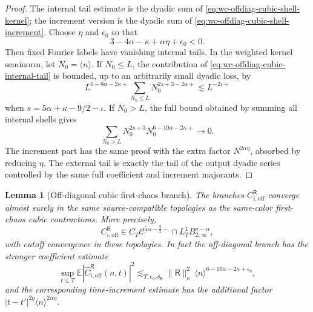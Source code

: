 \documentclass[10pt]{amsart}
\numberwithin{equation}{section}
\theoremstyle{plain}
\newtheorem{lemma}[theorem]{Lemma}
\theoremstyle{definition}
\theoremstyle{remark}
\newcommand{\E}{\mathbb{E}}
\begin{document}
\begin{proof}
The internal tail estimate is the dyadic sum of \eqref{eq:wc-offdiag-cubic-shell-kernel}; the increment version is the dyadic sum of \eqref{eq:wc-offdiag-cubic-shell-increment}.  Choose \(\eta\) and \(\epsilon_0\) so that
\[
        3-4\alpha-\kappa+\alpha\eta+\epsilon_0<0.
\]
Then fixed Fourier labels have vanishing internal tails.  In the weighted kernel seminorm, let \(N_0=\langle n\rangle\).  If \(N_0\le L\), the contribution of \eqref{eq:wc-offdiag-cubic-internal-tail} is bounded, up to an arbitrarily small dyadic loss, by
\[
        L^{6-8\alpha-2\kappa+}
        \sum_{N_0\le L} N_0^{2s+3-2\alpha+}
        \lesssim L^{-2\iota+}
\]
when \(s=5\alpha+\kappa-9/2-\iota\).  If \(N_0>L\), the full bound obtained by summing all internal shells gives
\[
        \sum_{N_0>L}N_0^{2s+3}N_0^{6-10\alpha-2\kappa+}\to0.
\]
The increment part has the same proof with the extra factor \(N^{2\alpha\eta}\), absorbed by reducing \(\eta\).  The external tail is exactly the tail of the output dyadic series controlled by the same full coefficient and increment majorants.
\end{proof}

\begin{lemma}[Off-diagonal cubic first-chaos branch]\label{lem:wc-cubic-offdiag}
The branches \(C_{i,\mathrm{off}}^{\mathsf R}\) converge almost surely in the same source-compatible topologies as the same-color first-chaos cubic contractions.  More precisely,
\begin{equation}\label{eq:wc-cubic-offdiag-bound}
        C_{i,\mathrm{off}}^{\mathsf R}
        \in C_T\mathcal C^{5\alpha-\frac92-}
        \cap L_T^1B_{2,\infty}^{\sigma-\alpha},
\end{equation}
with cutoff convergence in these topologies.  In fact the off-diagonal branch has the stronger coefficient estimate
\begin{equation}\label{eq:wc-cubic-offdiag-coefficient}
        \sup_{t\le T}\E|\widehat C_{i,\mathrm{off}}^{\mathsf R}(n,t)|^2
        \lesssim_{T,\epsilon_0,\delta_{\mathsf R}}
        \|\mathsf R\|_\kappa^2\,
        \langle n\rangle^{6-10\alpha-2\kappa+\epsilon_0},
\end{equation}
and the corresponding time-increment estimate has the additional factor \(|t-t'|^{2\eta}\langle n\rangle^{2\alpha\eta}\).
\end{lemma}
\end{document}
